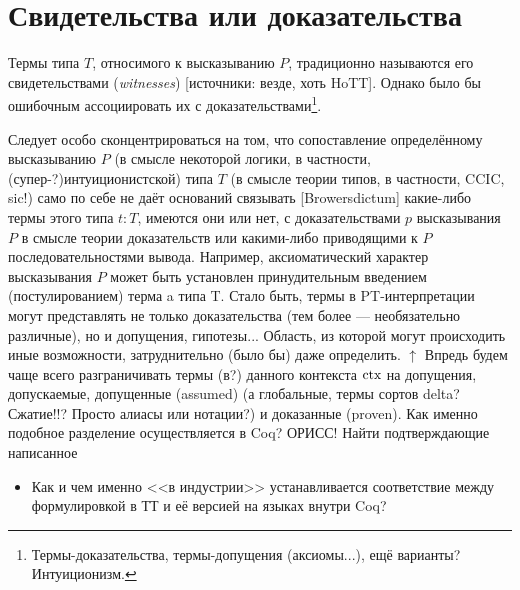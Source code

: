 \section{Свидетельства или доказательства}
Термы типа $T$, относимого к высказыванию $P$, традиционно называются его свидетельствами (\emph{witnesses}) [источники: везде, хоть HoTT]. Однако было бы ошибочным ассоциировать их с доказательствами\footnote{Термы-доказательства, термы-допущения (аксиомы...), ещё варианты? Интуиционизм.}.

Следует особо сконцентрироваться на том, что сопоставление определённому
высказыванию $P$ (в смысле некоторой логики, в частности, (супер-?)интуиционистской)
типа $T$ (в смысле теории типов, в частности, CCIC, sic!) само по себе не даёт 
оснований связывать [Browersdictum] какие-либо термы этого типа $t:T$, имеются они или нет, с
доказательствами $p$ высказывания $P$ в смысле теории доказательств или какими-либо
приводящими к $P$ последовательностями вывода. Например, аксиоматический характер 
высказывания $P$ может быть установлен принудительным введением (постулированием) 
терма a типа T. Стало быть, термы в PT-интерпретации могут представлять не только 
доказательства (тем более — необязательно различные), но и допущения, гипотезы... 
Область, из которой могут происходить иные возможности, затруднительно (было бы) 
даже определить. $\uparrow$ Впредь будем чаще всего разграничивать термы (в?) данного 
контекста $\textup{ctx}$ на допущения, допускаемые, допущенные (assumed) (а глобальные, термы 
сортов delta? Сжатие!!? Просто алиасы или нотации?) и доказанные (proven). Как 
именно подобное разделение осуществляется в Coq? ОРИСС! Найти подтверждающие 
написанное

\begin{itemize}
\item Как и чем именно <<в индустрии>> устанавливается соответствие между
формулировкой в ТТ и её версией на языках внутри Coq?
\end{itemize}